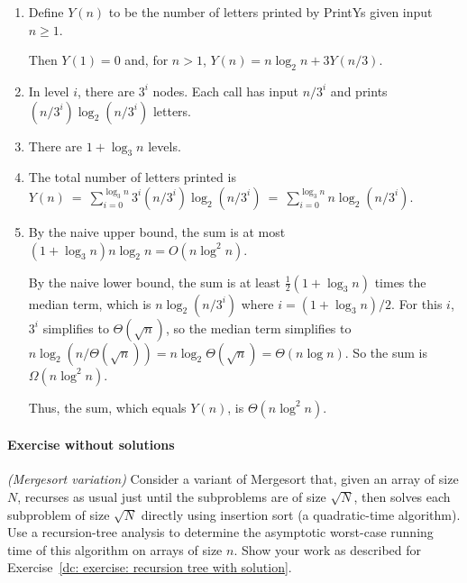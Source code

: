 \solution

\begin{enumerate}[label=(\roman*)]
\item Define $Y(n)$ to be the number of letters printed by {\sc PrintYs} given input $n\ge 1$.

  Then $Y(1) = 0$ and, for $n>1$, $Y(n) = n \log_2 n + 3 Y(n/3)$.
\item In level $i$, there are $3^i$ nodes.
  Each call has input $n/3^i$ and prints $(n/3^i)\log_2(n/3^i)$ letters.
\item There are $1 + \log_3 n$ levels.
\item The total number of letters printed is 
\( Y(n)
~=~ 
\sum_{i=0}^{\log_3 n} 3^i (n/3^i)\log_2 (n/3^i)
~=~
\sum_{i=0}^{\log_3 n} n\log_2(n/3^i)\).
\item By the naive upper bound, the sum is at most $(1+\log_3 n) n\log_2 n = O(n\log^2 n)$.

By the naive lower bound, the sum is at least $\frac{1}{2}(1+\log_3 n)$ times the median term,
which is $n\log_2(n/3^i)$ where $i = (1+\log_3 n)/2$.  For this $i$, $3^i$ simplifies to $\Theta(\sqrt n)$,
so the median term simplifies to $n\log_2 (n/\Theta(\sqrt n)) = n\log_2 \Theta(\sqrt n) = \Theta(n\log n)$.
So the sum is $\Omega(n\log^2 n)$.

Thus, the sum, which equals $Y(n)$, is $\Theta(n\log^2 n)$.
\end{enumerate}

\paragraph{Exercise without solutions}

\exercise\label{dc: exercise: mergesort}\emph{(Mergesort variation)} %
Consider a variant of Mergesort that, given an array of size $N$,
recurses as usual just until the subproblems are of size $\sqrt N$,
then solves each subproblem of size $\sqrt N$ directly using insertion sort
(a quadratic-time algorithm).
Use a recursion-tree analysis to determine
the asymptotic worst-case running time of this algorithm on arrays of size $n$.
Show your work as described for Exercise~\ref{dc: exercise: recursion tree with solution}.

